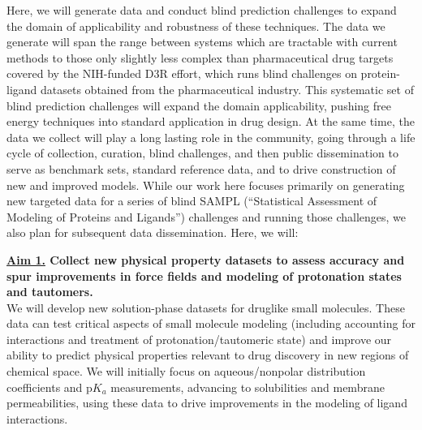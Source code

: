 \documentclass[11pt]{article}
\begin{document}
Here, we will generate data and conduct blind prediction challenges to expand the domain of applicability and robustness of these techniques. 
The data we generate will span the range between systems which are tractable with current methods to those only slightly less complex than pharmaceutical drug targets covered by the NIH-funded D3R effort, which runs blind challenges on protein-ligand datasets obtained from the pharmaceutical industry.
This systematic set of blind prediction challenges will expand the domain applicability, pushing free energy techniques into standard application in drug design.
At the same time, the data we collect will play a long lasting role in the community, going through a life cycle of collection, curation, blind challenges, and then public dissemination to serve as benchmark sets,
standard reference data, and to drive construction of new and improved models. 
While our work here focuses primarily on generating new targeted data for a series of blind SAMPL (``Statistical Assessment of Modeling of Proteins and Ligands'') challenges and running those challenges, we also plan for subsequent data dissemination. Here, we will: 


{\bf \underline{Aim 1.} Collect new physical property datasets to assess accuracy and spur improvements in force fields and modeling of protonation states and tautomers.}\\
We will develop new solution-phase datasets for druglike small molecules. 
These data can test critical aspects of small molecule modeling (including accounting for interactions and treatment of protonation/tautomeric state) and improve our ability to predict physical properties relevant to drug discovery in new regions of chemical space. 
We will initially focus on aqueous/nonpolar distribution coefficients and p$K_a$ measurements, advancing to solubilities and membrane permeabilities, using these data to drive improvements in the modeling of ligand interactions.
\end{document}
